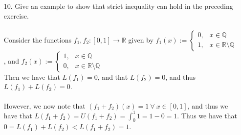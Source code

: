 \documentclass[12pt,letterpaper]{article}
\newcommand{\R}{\mathbb{R}}
\newcommand{\Q}{\mathbb{Q}}
\theoremstyle{case}
\theoremstyle{definition}
\begin{document}
\begin{enumerate}
\begin{enumerate}
\begin{proof}
				and let $m_{i_1} := \inf \{f_1(x): x \in [x_{i-1},x_i]\}$, $m_{i_2} := \inf \{f_2(x):x \in [x_{i-1},x_i]\}$, and let $m_{i_3}:=\inf \{f_1(x)+f_2(x):x \in [x_{i-1},x_i]\}$.
				\\\\We note that $m_{i_1} + m_{i_2} \leq f_1(x)+f_2(x)\ \forall\ x \in [x_{i-1},x_i]$.
				\\\\Then we have the following:
				\begin{align*}
					L(f_1,\mathcal{P}) + L(f_2,\mathcal{P}) &= \sum_{i=1}^{n} m_{i_1} (x_i-x_{i-1}) + \sum_{i=1}^{n} m_{i_2} (x_i-x_{i-1}) \\
					&= \sum_{i=1}^{n} (m_{i_1}+m_{i_2}) (x_i-x_{i-1}) \\
					&\leq \sum_{i=1}^{n} m_{i_3} (x_i-x_{i-1}), &\text{as was noted previously,} \\
					&= L(f_1+f_2, \mathcal{P}) \leq L(f_1+f_2)
				\end{align*}
				Then we have that $\sup \{L(f_1,\mathcal{P}) + L(f_2, \mathcal{P}): \mathcal{P} \in \mathscr{P}[a,b]\} \leq L(f_1+f_2)$. Thus,
				\begin{align*}
					L(f_1)+L(f_2) &=\sup\{L(f_1,\mathcal{P}): \mathcal{P} \in \mathscr{P}[a,b]\} + \sup \{L(f_2, \mathcal{P}): \mathcal{P} \in \mathscr{P}[a,b]\} \\ 
					&\leq \sup \{L(f_1+f_2,\mathcal{P}): \mathcal{P} \in \mathscr{P}[a,b]\} \\
					&=L(f_1+f_2)
				\end{align*}
				Thus we have that $L(f_1)+L(f_2) \leq L(f_1+f_2)$.
			\end{proof}
			\item[10.] Give an example to show that strict inequality can hold in the preceding exercise.
			\\\\Consider the functions $f_1,f_2:[0,1] \to \R$ given by $f_1(x):=\begin{cases}
			0, &x \in \Q \\
			1, &x \in \R\setminus\Q
			\end{cases}$, and $f_2(x):=\begin{cases}
			1, &x \in \Q \\
			0, &x \in \R\setminus\Q
			\end{cases}$
			\\Then we have that $L(f_1)=0$, and that $L(f_2)=0$, and thus $L(f_1)+L(f_2)=0$.
			\\\\However, we now note that $(f_1+f_2)(x)=1\ \forall\ x \in [0,1]$, and thus we have that $L(f_1+f_2)=U(f_1+f_2)=\displaystyle\int_{0}^{1} 1 = 1 - 0=1$. Thus we have that $0=L(f_1)+L(f_2) < L(f_1+f_2) = 1$.

\end{enumerate}
\end{enumerate}
\end{document}

